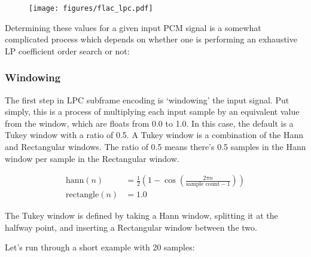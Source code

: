 \begin{figure}[h]
\texttt{[image: figures/flac\_lpc.pdf]}
\end{figure}
\par
\noindent
Determining these values for a given input PCM signal is a somewhat
complicated process which depends on whether one is performing an
exhaustive LP coefficient order search or not:

\begin{figure}[h]
\qquad
{}
\end{figure}

\pagebreak

\subsubsection{Windowing}

The first step in LPC subframe encoding is `windowing' the input signal.
Put simply, this is a process of multiplying each input sample by
an equivalent value from the window, which are floats from 0.0 to 1.0.
In this case, the default is a Tukey window with a ratio of 0.5.
A Tukey window is a combination of the Hann and Rectangular windows.
The ratio of 0.5 means there's 0.5 samples in the Hann window per
sample in the Rectangular window.

\begin{align}
\text{hann}(n) &= \frac{1}{2} \left ( 1 - \cos \left ( \frac{2 \pi n}{\text{sample count} - 1} \right ) \right ) \\
\text{rectangle}(n) &= 1.0
\end{align}

The Tukey window is defined by taking a Hann window, splitting it at
the halfway point, and inserting a Rectangular window between the
two.

\begin{figure}[h]
\end{figure}

Let's run through a short example with 20 samples:

